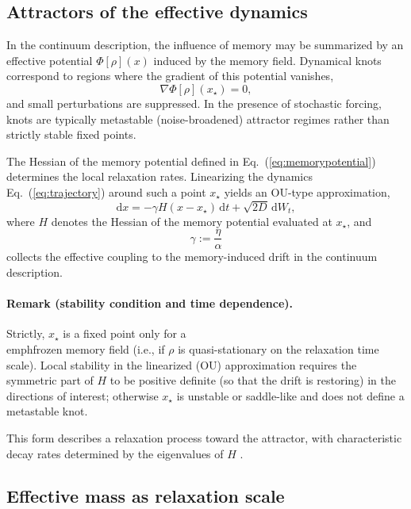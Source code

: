\documentclass[reprint,amsmath,amssymb,aps,prd,nofootinbib,floatfix]{revtex4-2}
\begin{document}
\subsection{Attractors of the effective dynamics}

In the continuum description, the influence of memory may be summarized by an effective
potential $\Phi[\rho](x)$ induced by the memory field.
Dynamical knots correspond to regions where the gradient of this potential vanishes,
\begin{equation}
\nabla \Phi[\rho](x_\star) = 0,
\end{equation}
and small perturbations are suppressed. In the presence of stochastic forcing, knots are typically metastable (noise-broadened) attractor regimes rather than strictly stable fixed points.

The Hessian of the memory potential defined in Eq.~(\ref{eq:memorypotential}) determines the local relaxation rates. 
Linearizing the dynamics Eq.~(\ref{eq:trajectory}) around such a point $x_\star$ yields an OU-type approximation,
\begin{equation}
\mathrm{d}x = -\gamma H (x - x_\star)\,\mathrm{d}t + \sqrt{2D}\,\mathrm{d}W_t,
\end{equation}
where $H$ denotes the Hessian of the memory potential evaluated at $x_\star$, and
\begin{equation}
\gamma := \frac{\eta}{\alpha}
\end{equation}
collects the effective coupling to the memory-induced drift in the continuum description.

\paragraph{Remark (stability condition and time dependence).}
Strictly, $x_\star$ is a fixed point only for a \\emph{frozen} memory field (i.e., if $\rho$ is quasi-stationary on the relaxation time scale).
Local stability in the linearized (OU) approximation requires the symmetric part of $H$ to be positive definite (so that the drift is restoring) in the directions of interest; otherwise $x_\star$ is unstable or saddle-like and does not define a metastable knot.

This form describes a relaxation process toward the attractor, with characteristic decay
rates determined by the eigenvalues of $H$ \cite{Strogatz2018}.

\subsection{Effective mass as relaxation scale}
\end{document}
